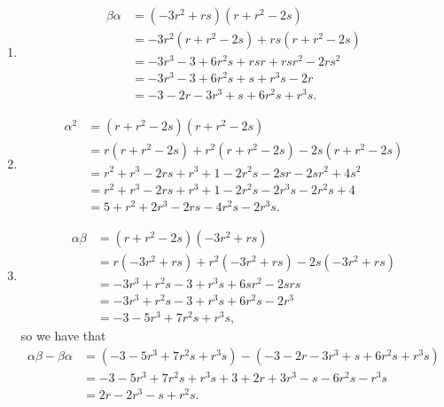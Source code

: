 \documentclass[9pt]{article}
\begin{document}
\begin{enumerate}
      \begin{enumerate}
         \item \begin{align*}
                  \beta\alpha &= (-3r^2 + rs)(r + r^2 - 2s) \\
                     &= -3r^2(r + r^2 - 2s) + rs(r + r^2 - 2s) \\
                     &= -3r^3 - 3 + 6r^2s + rsr + rsr^2 - 2rs^2 \\
                     &= -3r^3 - 3 + 6r^2s + s + r^3s - 2r \\
                     &= - 3 - 2r - 3r^3 + s + 6r^2s + r^3s.
               \end{align*}
         \item \begin{align*}
                  \alpha^2 &= (r + r^2 - 2s)(r + r^2 - 2s) \\
                     &= r(r + r^2 - 2s) + r^2(r + r^2 - 2s) - 2s(r + r^2 - 2s)\\
                     &= r^2 + r^3 - 2rs + r^3 + 1 - 2r^2s - 2sr -2sr^2 + 4s^2 \\
                     &= r^2 + r^3 - 2rs + r^3 + 1 - 2r^2s - 2r^3s -2r^2s + 4 \\
                     &= 5 + r^2 + 2r^3 - 2rs - 4r^2s - 2r^3s.
               \end{align*}
         \item \begin{align*}
                  \alpha\beta &= (r + r^2 - 2s)(-3r^2 + rs) \\
                     &= r(-3r^2 + rs) + r^2(-3r^2 + rs) - 2s(-3r^2 + rs) \\
                     &= -3r^3 + r^2s - 3 + r^3s + 6sr^2 - 2srs \\
                     &= -3r^3 + r^2s - 3 + r^3s + 6r^2s - 2r^3 \\
                     &= -3 - 5r^3 + 7r^2s + r^3s,
               \end{align*}
               so we have that
               \begin{align*}
                  \alpha\beta - \beta\alpha &= (-3 - 5r^3 + 7r^2s + r^3s) -
                     (-3 - 2r - 3r^3 + s + 6r^2s + r^3s) \\
                     &= -3 - 5r^3 + 7r^2s + r^3s + 3 + 2r + 3r^3 - s -
                        6r^2s - r^3s \\
                     &= 2r - 2r^3 - s + r^2s.
               \end{align*}

\end{enumerate}
\end{enumerate}
\end{document}
